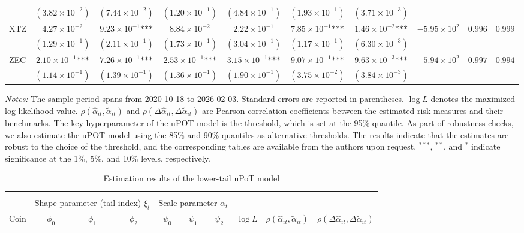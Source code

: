 \documentclass{article}
\begin{document}
\begin{landscape}
\begin{longtable}{lccccccccc}
 & $(3.82\times 10^{-2})$ & $(7.44\times 10^{-2})$ & $(1.20\times 10^{-1})$ & $(4.84\times 10^{-1})$ & $(1.93\times 10^{-1})$ & $(3.71\times 10^{-3})$ &  &  &  \\
XTZ & $4.27\times 10^{-2}$ & $9.23\times 10^{-1}\text{***}$ & $8.84\times 10^{-2}$ & $2.22\times 10^{-1}$ & $7.85\times 10^{-1}\text{***}$ & $1.46\times 10^{-2}\text{***}$ & $-5.95\times 10^{2}$ & $0.996$ & $0.999$ \\
 & $(1.29\times 10^{-1})$ & $(2.11\times 10^{-1})$ & $(1.73\times 10^{-1})$ & $(3.04\times 10^{-1})$ & $(1.17\times 10^{-1})$ & $(6.30\times 10^{-3})$ &  &  &  \\
ZEC & $2.10\times 10^{-1}\text{***}$ & $7.26\times 10^{-1}\text{***}$ & $2.53\times 10^{-1}\text{***}$ & $3.15\times 10^{-1}\text{***}$ & $9.07\times 10^{-1}\text{***}$ & $9.63\times 10^{-3}\text{***}$ & $-5.94\times 10^{2}$ & $0.997$ & $0.994$ \\
 & $(1.14\times 10^{-1})$ & $(1.39\times 10^{-1})$ & $(1.36\times 10^{-1})$ & $(1.90\times 10^{-1})$ & $(3.75\times 10^{-2})$ & $(3.84\times 10^{-3})$ &  &  &  \\
\end{longtable}

\begin{flushleft}
{\footnotesize
\textit{Notes:} The sample period spans from 2020-10-18 to 2026-02-03. Standard errors are reported in parentheses. $\log L$ denotes the maximized log-likelihood value. $\rho(\hat{\alpha}_{it},\tilde{\alpha}_{it})$ and $\rho(\Delta\hat{\alpha}_{it},\Delta\tilde{\alpha}_{it})$ are Pearson correlation coefficients between the estimated risk measures and their benchmarks. The key hyperparameter of the uPOT model is the threshold, which is set at the 95\% quantile. As part of robustness checks, we also estimate the uPOT model using the 85\% and 90\% quantiles as alternative thresholds. The results indicate that the estimates are robust to the choice of the threshold, and the corresponding tables are available from the authors upon request. $^{***}$, $^{**}$, and $^{*}$ indicate significance at the 1\%, 5\%, and 10\% levels, respectively.
}
\end{flushleft}

\clearpage

\begin{longtable}{lccccccccc}
\caption{Estimation results of the lower-tail uPoT model}\\
\label{tab:downtail_uPot} \\
\toprule
& \multicolumn{3}{c}{Shape parameter (tail index) $\xi_t$}
& \multicolumn{3}{c}{Scale parameter $\alpha_t$}
& & & \\
\cmidrule(lr){2-4} \cmidrule(lr){5-7}
Coin
& $\phi_0$ & $\phi_1$ & $\phi_2$
& $\psi_0$ & $\psi_1$ & $\psi_2$
& $\log L$
& $\rho(\hat{\alpha}_{it},\tilde{\alpha}_{it})$
& $\rho(\Delta\hat{\alpha}_{it},\Delta\tilde{\alpha}_{it})$ \\
\midrule
\endfirsthead


\end{longtable}
\end{landscape}
\end{document}
